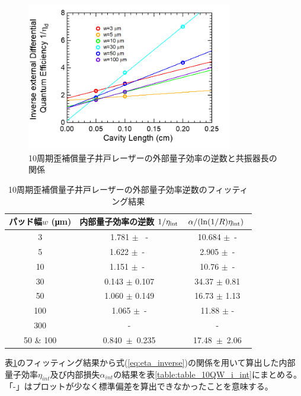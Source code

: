 {\begin{figure}[h]
	\centering
	\includegraphics[width=9cm]{figure/fig_3_1_10QW_broadcontact_id_inverse_02.png}
	\caption{10周期歪補償量子井戸レーザーの外部量子効率の逆数と共振器長の関係}
	\label{fig:fig_3_1_10QW_broadcontact_id_inverse_02}
\end{figure}
\begin{table}[h]
  \caption{10周期歪補償量子井戸レーザーの外部量子効率逆数のフィッティング結果}
  \label{table:table_10QW_i_d_fit}
  \centering
  \begin{tabular}{ccc}
    \hline
    パッド幅$w$ (\si{\micro\metre})  &  内部量子効率の逆数 $1/\eta_{\rm{int}} $ & $\alpha/(\ln(1/R)\eta_{\rm{int}})\ $ \\
    \hline \hline
     3 & 1.781 $\pm$ \ -  & 10.684 $\pm$\ - \\
    5  & 1.622 $\pm$\ -\  & 2.905 $\pm$\ -\\
    10  & 1.151 $\pm$\ -\  & 10.76 $\pm$\ -\\ 
    30& 0.143 $\pm$ 0.107& 34.37 $\pm$ 0.81\\
    50& 1.060 $\pm$ 0.149&16.73 $\pm$ 1.13 \\
    100& 1.065 $\pm$\ -& 11.88 $\pm$ -\\
    300&- & -\\
    \hline
    50 \& 100  &0.840\ $\pm$\ 0.235& 17.48\ $\pm$\ 2.06\\ 
    \hline
  \end{tabular}
\end{table}

\newpage
表\ref{table:table_10QW_i_d_fit}のフィッティング結果から式(\ref{eq:eta_inverse})の関係を用いて算出した内部量子効率$\eta_{int}$及び内部損失$\alpha_{int}$の結果を表\ref{table:table_10QW_i_int}にまとめる。「-」はプロットが少なく標準偏差を算出できなかったことを意味する。

}
